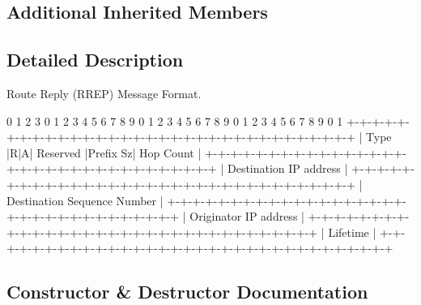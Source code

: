 \subsection*{Additional Inherited Members}


\subsection{Detailed Description}
Route Reply (R\+R\+EP) Message Format. 

\begin{DoxyVerb}0                   1                   2                   3
0 1 2 3 4 5 6 7 8 9 0 1 2 3 4 5 6 7 8 9 0 1 2 3 4 5 6 7 8 9 0 1
+-+-+-+-+-+-+-+-+-+-+-+-+-+-+-+-+-+-+-+-+-+-+-+-+-+-+-+-+-+-+-+-+
|     Type      |R|A|    Reserved     |Prefix Sz|   Hop Count   |
+-+-+-+-+-+-+-+-+-+-+-+-+-+-+-+-+-+-+-+-+-+-+-+-+-+-+-+-+-+-+-+-+
|                     Destination IP address                    |
+-+-+-+-+-+-+-+-+-+-+-+-+-+-+-+-+-+-+-+-+-+-+-+-+-+-+-+-+-+-+-+-+
|                  Destination Sequence Number                  |
+-+-+-+-+-+-+-+-+-+-+-+-+-+-+-+-+-+-+-+-+-+-+-+-+-+-+-+-+-+-+-+-+
|                    Originator IP address                      |
+-+-+-+-+-+-+-+-+-+-+-+-+-+-+-+-+-+-+-+-+-+-+-+-+-+-+-+-+-+-+-+-+
|                           Lifetime                            |
+-+-+-+-+-+-+-+-+-+-+-+-+-+-+-+-+-+-+-+-+-+-+-+-+-+-+-+-+-+-+-+-+
\end{DoxyVerb}
 

\subsection{Constructor \& Destructor Documentation}

